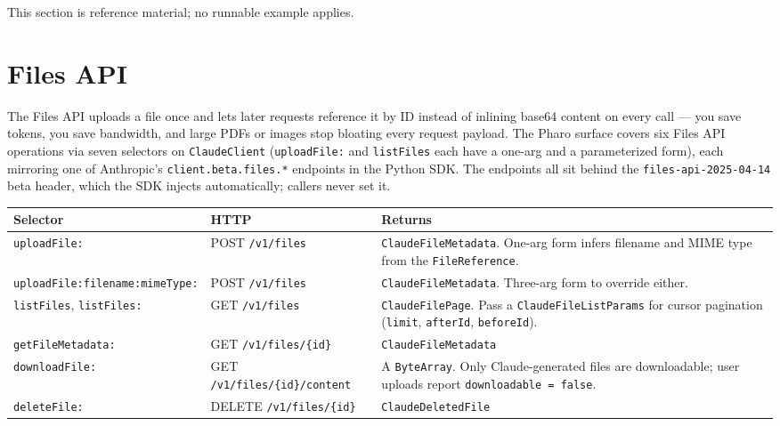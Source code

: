 \documentclass[a4paper,10pt,fleqn]{article}
\begin{document}
This section is reference material; no runnable example applies.

\medskip
{}

\section{Files API}
\label{sec:files}

The Files API uploads a file once and lets later requests reference
it by ID instead of inlining base64 content on every call --- you
save tokens, you save bandwidth, and large PDFs or images stop
bloating every request payload.  The Pharo surface covers six Files
API operations via seven selectors on \texttt{ClaudeClient}
(\texttt{uploadFile:} and \texttt{listFiles} each have a one-arg and
a parameterized form), each mirroring one of Anthropic's
\texttt{client.beta.files.*} endpoints in the Python SDK.  The
endpoints all sit behind the \texttt{files-api-2025-04-14} beta
header, which the SDK injects automatically; callers never set it.

\begin{center}
\small
\begin{tabular}{@{}l l p{5.4cm}@{}}
\toprule
\textbf{Selector} & \textbf{HTTP} & \textbf{Returns} \\
\midrule
\texttt{uploadFile:} & POST \texttt{/v1/files} & \texttt{ClaudeFileMetadata}.  One-arg form infers filename and MIME type from the \texttt{FileReference}. \\
\texttt{uploadFile:filename:mimeType:} & POST \texttt{/v1/files} & \texttt{ClaudeFileMetadata}.  Three-arg form to override either. \\
\texttt{listFiles}, \texttt{listFiles:} & GET \texttt{/v1/files} & \texttt{ClaudeFilePage}.  Pass a \texttt{ClaudeFileListParams} for cursor pagination (\texttt{limit}, \texttt{afterId}, \texttt{beforeId}). \\
\texttt{getFileMetadata:} & GET \texttt{/v1/files/\{id\}} & \texttt{ClaudeFileMetadata} \\
\texttt{downloadFile:} & GET \texttt{/v1/files/\{id\}/content} & A \texttt{ByteArray}.  Only Claude-generated files are downloadable; user uploads report \texttt{downloadable\,=\,false}. \\
\texttt{deleteFile:} & DELETE \texttt{/v1/files/\{id\}} & \texttt{ClaudeDeletedFile} \\
\bottomrule
\end{tabular}
\end{center}
\end{document}
